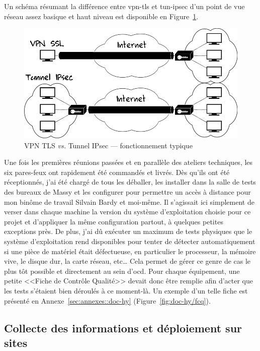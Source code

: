 \documentclass[12pt, oneside, a4paper, titlepage]{report}
\begin{document}
Un schéma résumant la différence entre \gls{vpn-tls} et \gls{tun-ipsec} d'un
point de vue réseau assez basique et haut niveau est disponible en
Figure~\ref{fig:misc/tls-vs-ipsec}.

\begin{figure}[h!]
    \centering
    \includegraphics[width = 0.8\linewidth]{img/misc/tls-vs-ipsec.png}
    \caption{VPN TLS \textit{vs.} Tunnel IPsec --- fonctionnement typique}%
    \label{fig:misc/tls-vs-ipsec}
\end{figure}

Une fois les premières réunions passées et en parallèle des ateliers techniques,
les six pares-feux ont rapidement été commandés et livrés. Dès qu'ils ont été
réceptionnés, j'ai été chargé de tous les déballer, les installer dans la salle
de tests des bureaux de Massy et les configurer pour permettre un accès à
distance pour mon binôme de travail Silvain Bardy et moi-même. Il s'agissait ici
simplement de verser dans chaque machine la version du système d'exploitation
choisie pour ce projet et d'appliquer la même configuration partout, à quelques
petites exceptions près. De plus, j'ai dû exécuter un maximum de tests physiques
que le système d'exploitation rend disponibles pour tenter de détecter
automatiquement si une pièce de matériel était défectueuse, en particulier le
processeur, la mémoire vive, le disque dur, la carte réseau, etc\ldots{} Cela
permet de gérer ce genre de cas le plus tôt possible et directement au sein
d'\gls{ocd}. Pour chaque équipement, une petite <<Fiche de Contrôle Qualité>>
devait donc être remplie afin d'acter que les tests s'étaient bien déroulés à ce
moment-là. Un exemple d'un telle fiche est présenté en
Annexe~\ref{sec:annexes::doc-hy} (Figure~\ref{fig:doc-hy/fcq}).

\subsection{Collecte des informations et déploiement sur sites}%
\label{sub:mission::main::collec}
\end{document}
